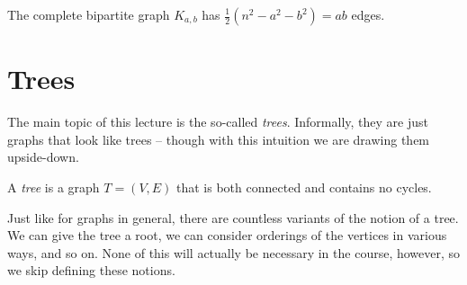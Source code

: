 \documentclass[nobib]{tufte-handout}
\begin{document}
\begin{corollary}
  The complete bipartite graph $K_{a,b}$ has $\frac{1}{2}\left(n^2 - a^2 - b^2\right) = ab$ edges.
\end{corollary}

\section{Trees}

The main topic of this lecture is the so-called \emph{trees}. Informally, they are just graphs that look like trees -- though with this intuition we are drawing them upside-down.

\begin{definition}
  A \emph{tree} is a graph $T = (V,E)$ that is both connected and contains no cycles.
\end{definition}

Just like for graphs in general, there are countless variants of the notion of a tree. We can give the tree a root, we can consider orderings of the vertices in various ways, and so on. None of this will actually be necessary in the course, however, so we skip defining these notions.
\end{document}
